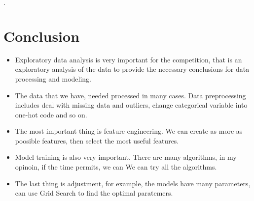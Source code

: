 \begin{itemize}
\DIFdelend \DIFaddbegin {}\DIFaddend .
\end{itemize}
\DIFaddbegin \newpage
\DIFaddend 



\section{Conclusion}

\begin{itemize}
	\item Exploratory data analysis is 
	very important for the competition,
	that is an exploratory analysis 
	of the data to 
	provide the necessary conclusions 
	for data processing and modeling. 
	\item The data that we have,
	needed processed in many cases.
	Data preprocessing includes 
	deal with missing data and outliers,
	change categorical variable 
	into one-hot code and so on.
	\item The most important thing is
	feature engineering.
	We can create as more as poosible features,
	then select the most useful features.
	\item Model training is also very important.
	There are many algorithms, 
	in my opinoin, 
	if the time permits,
	we can We can try all the algorithms. 
	\item The last thing is adjustment,
	for example,
	the models have many parameters,
	can use Grid Search to find 
	the optimal paratemers.	
\end{itemize}











